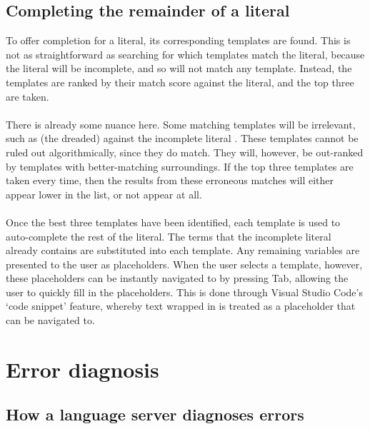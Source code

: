 \documentclass[../main.tex]{subfiles}
\begin{document}
\subsection{Completing the remainder of a literal}
To offer completion for a literal, its corresponding templates are found. This is not as straightforward as searching for which templates match the literal, because the literal will be incomplete, and so will not match any template. Instead, the templates are ranked by their match score against the literal, and the top three are taken.
\\
\\
There is already some nuance here. Some matching templates will be irrelevant, such as (the dreaded)  against the incomplete literal . These templates cannot be ruled out algorithmically, since they do match. They will, however, be out-ranked by templates with better-matching surroundings. If the top three templates are taken every time, then the results from these erroneous matches will either appear lower in the list, or not appear at all.
\\ 
\\
Once the best three templates have been identified, each template is used to auto-complete the rest of the literal. The terms that the incomplete literal already contains are substituted into each template. Any remaining variables are presented to the user as placeholders. When the user selects a template, however, these placeholders can be instantly navigated to by pressing Tab, allowing the user to quickly fill in the placeholders. This is done through Visual Studio Code's `code snippet' feature, whereby text wrapped in \codeword{${  }} is treated as a placeholder that can be navigated to.
%
%
%
\section{Error diagnosis}
\subsection{How a language server diagnoses errors}
\end{document}
